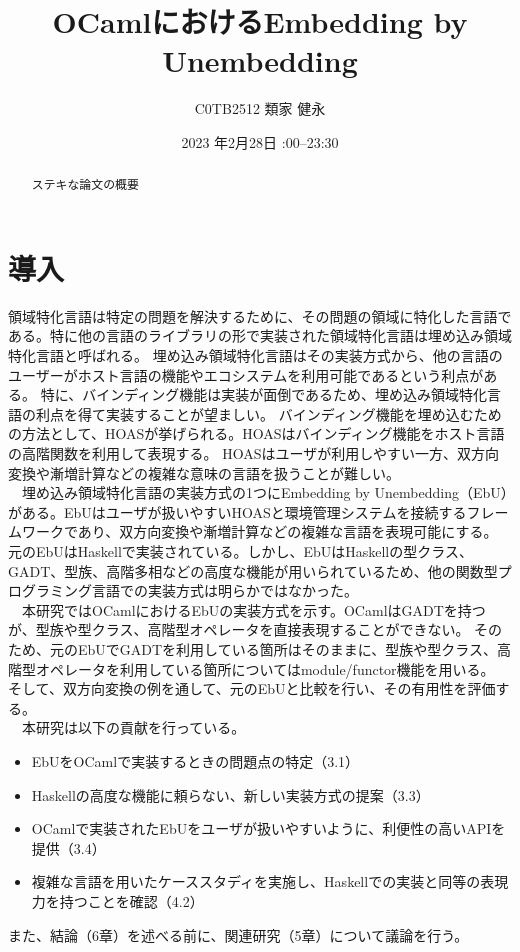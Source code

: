 \documentclass[uplatex]{sumiilab-paper}
\title{OCamlにおけるEmbedding by Unembedding}
\author{C0TB2512 類家 健永}
\institute{東北大学 工学部\\電気情報物理工学科}%
\date{2023 年2月28日 \quad 23:00--23:30}
\theoremstyle{mystyle}
\numberwithin{definition}{chapter} %
\begin{document}
\frontmatter%

\maketitle

\begin{abstract}
ステキな論文の概要
\end{abstract}

\tableofcontents%

\mainmatter%

\chapter{導入}
領域特化言語は特定の問題を解決するために、その問題の領域に特化した言語である。特に他の言語のライブラリの形で実装された領域特化言語は埋め込み領域特化言語と呼ばれる。
埋め込み領域特化言語はその実装方式から、他の言語のユーザーがホスト言語の機能やエコシステムを利用可能であるという利点がある。
特に、バインディング機能は実装が面倒であるため、埋め込み領域特化言語の利点を得て実装することが望ましい。
バインディング機能を埋め込むための方法として、HOASが挙げられる。HOASはバインディング機能をホスト言語の高階関数を利用して表現する。
HOASはユーザが利用しやすい一方、双方向変換や漸増計算などの複雑な意味の言語を扱うことが難しい。\\
　埋め込み領域特化言語の実装方式の1つにEmbedding by Unembedding（EbU）がある。EbUはユーザが扱いやすいHOASと環境管理システムを接続するフレームワークであり、双方向変換や漸増計算などの複雑な言語を表現可能にする。
元のEbUはHaskellで実装されている。しかし、EbUはHaskellの型クラス、GADT、型族、高階多相などの高度な機能が用いられているため、他の関数型プログラミング言語での実装方式は明らかではなかった。\\
　本研究ではOCamlにおけるEbUの実装方式を示す。OCamlはGADTを持つが、型族や型クラス、高階型オペレータを直接表現することができない。
そのため、元のEbUでGADTを利用している箇所はそのままに、型族や型クラス、高階型オペレータを利用している箇所についてはmodule/functor機能を用いる。
そして、双方向変換の例を通して、元のEbUと比較を行い、その有用性を評価する。\\
　本研究は以下の貢献を行っている。
\begin{itemize}
  \item EbUをOCamlで実装するときの問題点の特定（3.1）
  \item Haskellの高度な機能に頼らない、新しい実装方式の提案（3.3）
  \item OCamlで実装されたEbUをユーザが扱いやすいように、利便性の高いAPIを提供（3.4）
  \item 複雑な言語を用いたケーススタディを実施し、Haskellでの実装と同等の表現力を持つことを確認（4.2）
\end{itemize}
また、結論（6章）を述べる前に、関連研究（5章）について議論を行う。
\end{document}

